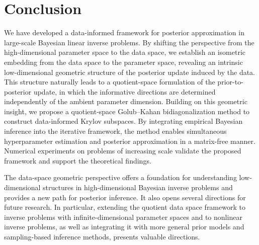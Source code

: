 \documentclass[]{myarticle}
\begin{document}
\section{Conclusion}\label{sec6}
We have developed a data-informed framework for posterior approximation in large-scale Bayesian linear inverse problems. By shifting the perspective from the high-dimensional parameter space to the data space, we establish an isometric embedding from the data space to the parameter space, revealing an intrinsic low-dimensional geometric structure of the posterior update induced by the data. This structure naturally leads to a quotient-space formulation of the prior-to-posterior update, in which the informative directions are determined independently of the ambient parameter dimension. Building on this geometric insight, we propose a quotient-space Golub--Kahan bidiagonalization method to construct data-informed Krylov subspaces. By integrating empirical Bayesian inference into the iterative framework, the method enables simultaneous hyperparameter estimation and posterior approximation in a matrix-free manner. Numerical experiments on problems of increasing scale validate the proposed framework and support the theoretical findings.

The data-space geometric perspective offers a foundation for understanding low-dimensional structures in high-dimensional Bayesian inverse problems and provides a new path for posterior inference. It also opens several directions for future research. In particular, extending the quotient data space framework to inverse problems with infinite-dimensional parameter spaces and to nonlinear inverse problems, as well as integrating it with more general prior models and sampling-based inference methods, presents valuable directions.


\appendix 
\end{document}
